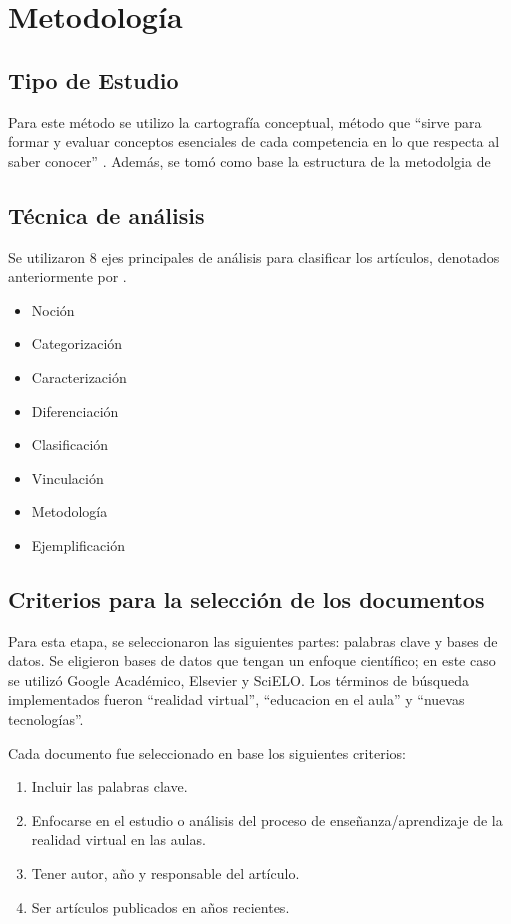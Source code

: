 \section{Metodología}
\subsection{Tipo de Estudio}
Para este método se utilizo la cartografía conceptual, método que “sirve para formar y evaluar conceptos esenciales de cada competencia en lo que respecta al saber conocer” \parencite[][p. 16]{tobon2012}. Adem\'as, se tom\'o como base la estructura de la metodolgia de \textcite{guzman2020} 
\subsection{Técnica de análisis}
Se utilizaron 8 ejes principales de an\'alisis para clasificar los artículos, denotados anteriormente por \textcite{tobon2012} .
\begin{itemize}
   \item Noción
   \item Categorización
   \item Caracterización
   \item Diferenciación
   \item Clasificación
   \item Vinculación
   \item Metodología
   \item Ejemplificación
\end{itemize}



\subsection{Criterios para la selección de los documentos}

Para esta etapa, se seleccionaron las siguientes partes: palabras clave y bases de datos. Se eligieron bases de datos que tengan un enfoque científico; en este caso se utilizó Google Académico, Elsevier y SciELO. Los términos de búsqueda implementados fueron “realidad virtual”, “educacion en el aula” y “nuevas tecnologías”.

Cada documento fue seleccionado en base los siguientes criterios:

\begin{enumerate}
   \item Incluir las palabras clave.
   \item Enfocarse en el estudio o análisis del proceso de enseñanza/aprendizaje de la realidad virtual en las aulas.
   \item Tener autor, año y responsable del artículo.
   \item Ser artículos publicados en años recientes.
\end{enumerate}


